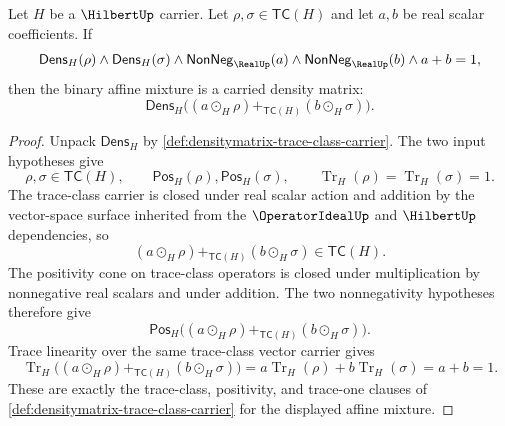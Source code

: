 \begin{lemma}
\label{lem:densitymatrix-binary-convex-closure}
Let $H$ be a $\HilbertUp$ carrier. Let $\rho,\sigma\in\mathsf{TC}(H)$ and let $a,b$ be real scalar coefficients. If
$$
\mathsf{Dens}_H(\rho)\land \mathsf{Dens}_H(\sigma)
\land \mathsf{NonNeg}_{\RealUp}(a)\land \mathsf{NonNeg}_{\RealUp}(b)
\land a+b=1,
$$
then the binary affine mixture is a carried density matrix:
$$
\mathsf{Dens}_H\bigl((a\odot_H\rho)+_{\mathsf{TC}(H)}(b\odot_H\sigma)\bigr).
$$
\end{lemma}
\begin{proof}
Unpack $\mathsf{Dens}_H$ by \autoref{def:densitymatrix-trace-class-carrier}. The two input hypotheses give
$$
\rho,\sigma\in\mathsf{TC}(H),
\qquad
\mathsf{Pos}_H(\rho),\mathsf{Pos}_H(\sigma),
\qquad
\operatorname{Tr}_H(\rho)=\operatorname{Tr}_H(\sigma)=1.
$$
The trace-class carrier is closed under real scalar action and addition by the vector-space surface inherited from the $\OperatorIdealUp$ and $\HilbertUp$ dependencies, so
$$
(a\odot_H\rho)+_{\mathsf{TC}(H)}(b\odot_H\sigma)\in\mathsf{TC}(H).
$$
The positivity cone on trace-class operators is closed under multiplication by nonnegative real scalars and under addition. The two nonnegativity hypotheses therefore give
$$
\mathsf{Pos}_H\bigl((a\odot_H\rho)+_{\mathsf{TC}(H)}(b\odot_H\sigma)\bigr).
$$
Trace linearity over the same trace-class vector carrier gives
$$
\operatorname{Tr}_H\bigl((a\odot_H\rho)+_{\mathsf{TC}(H)}(b\odot_H\sigma)\bigr)
=
a\operatorname{Tr}_H(\rho)+b\operatorname{Tr}_H(\sigma)
=
a+b
=
1.
$$
These are exactly the trace-class, positivity, and trace-one clauses of \autoref{def:densitymatrix-trace-class-carrier} for the displayed affine mixture.
\end{proof}


